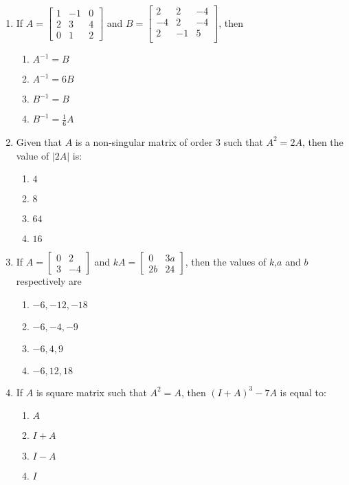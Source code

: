 \documentclass{article}
\begin{document}
\begin{enumerate}
    \item If $A = \begin{bmatrix}
        1 & -1 & 0 \\
        2 & 3 & 4 \\
        0 & 1 & 2
    \end{bmatrix}$ and $B = \begin{bmatrix}
        2 & 2 & -4 \\ 
        -4 & 2 &-4 \\
        2 & -1 & 5 \\
    \end{bmatrix}$, then
    \begin{enumerate}
        \item $A^{-1} = B$
        \item $A^{-1} = 6B$
        \item $B^{-1} = B$
        \item $B^{-1} = \frac{1}{6} A$
    \end{enumerate}
    \item Given that $A$ is a non-singular matrix of order $3$ such that $A^2 = 2A$, then the value of $|2A|$ is:
    \begin{enumerate}
        \item $4$
        \item $8$
        \item $64$
        \item $16$
    \end{enumerate}
    
    \item If $A = \begin{bmatrix}
      0 & 2\\ 
      3 & -4 
    \end{bmatrix}$ and $kA = \begin{bmatrix}
      0 & 3a \\
      2b & 24 
    \end{bmatrix}$, then the values of $k$,$a$ and $b$ respectively are
    \begin{enumerate}
        \item $-6, -12, -18$
        \item $-6, -4, -9$
        \item $-6, 4, 9$
        \item $-6, 12, 18$ 
    \end{enumerate}
    
    \item If $A$ is square matrix such that $A^2 = A$, then $(I + A)^3  -7A$ is equal to:
    \begin{enumerate}
        \item $A$
        \item $I + A$
        \item $I - A$
        \item $I$ 
    \end{enumerate}
    

\end{enumerate}
\end{document}
